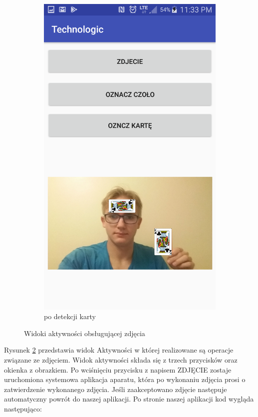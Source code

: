 \begin{figure}[H]
\begin{subfigure}{0.25\textwidth}
        \includegraphics[width=\linewidth]{imgs/oba.png}
        \caption{po detekcji karty}
        \label{fig:zdjecieObo}
    \end{subfigure}
    \caption{Widoki aktywności obsługującej zdjęcia}
    \label{widokiPhoto}
\end{figure}

Rysunek \ref{widokiPhoto} przedstawia widok Aktywności w której realizowane są operacje związane ze zdjęciem. Widok aktywności składa się z trzech przycisków oraz okienka z obrazkiem. 
Po wciśnięciu przycisku z napisem ZDJĘCIE zostaje uruchomiona systemowa aplikacja aparatu, która po wykonaniu zdjęcia prosi o zatwierdzenie wykonanego zdjęcia. Jeśli zaakceptowano zdjęcie następuje automatyczny powrót do naszej aplikacji.
Po stronie naszej aplikacji kod wygląda następująco:

